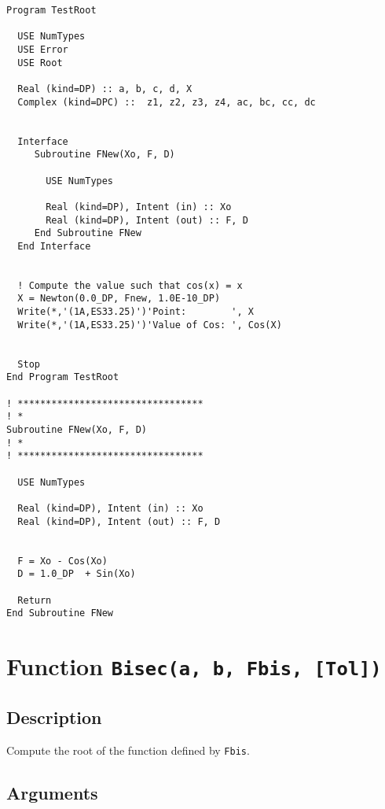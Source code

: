 \begin{lstlisting}[emph=Newton,
                   emphstyle=\color{blue},
                   frame=trBL,
                   caption=Computing roots of non-linear functions
                   with the Newton method.,
                   label=newton]
Program TestRoot

  USE NumTypes
  USE Error
  USE Root

  Real (kind=DP) :: a, b, c, d, X
  Complex (kind=DPC) ::  z1, z2, z3, z4, ac, bc, cc, dc


  Interface
     Subroutine FNew(Xo, F, D)
       
       USE NumTypes
       
       Real (kind=DP), Intent (in) :: Xo
       Real (kind=DP), Intent (out) :: F, D
     End Subroutine FNew
  End Interface


  ! Compute the value such that cos(x) = x
  X = Newton(0.0_DP, Fnew, 1.0E-10_DP)
  Write(*,'(1A,ES33.25)')'Point:        ', X
  Write(*,'(1A,ES33.25)')'Value of Cos: ', Cos(X)


  Stop
End Program TestRoot

! *********************************
! *
Subroutine FNew(Xo, F, D)
! *
! *********************************  

  USE NumTypes
  
  Real (kind=DP), Intent (in) :: Xo
  Real (kind=DP), Intent (out) :: F, D

  
  F = Xo - Cos(Xo)
  D = 1.0_DP  + Sin(Xo)

  Return
End Subroutine FNew
\end{lstlisting}


\section{Function \texttt{Bisec(a,  b,  Fbis,  [Tol])}}

\subsection{Description}

Compute the root of the function defined by \texttt{Fbis}. 

\subsection{Arguments}

